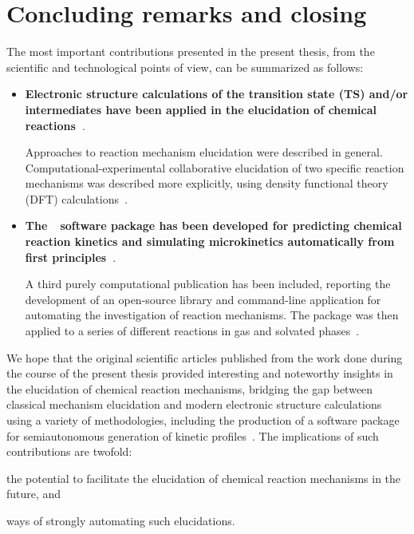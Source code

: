 \chapter{Concluding remarks and closing}%
\label{ch:conclusion}


The most important contributions presented in the present thesis,
from the scientific and technological points of view, can be summarized as follows:

\begin{itemize}
	\item \textbf{Electronic structure calculations of the transition state (TS)
		      and/or intermediates have been applied
		      in the elucidation of chemical reactions~\cite{Coelho_2019,Oliveira_2020}}.

	      Approaches to reaction mechanism elucidation were described in general.
	      Computational-experimental collaborative elucidation of two specific reaction mechanisms was described more explicitly,
	      using density functional theory (DFT) calculations~\cite{Coelho_2019,Oliveira_2020}.

	\item \textbf{The~\overreact{}~software package has been developed for predicting chemical reaction kinetics
		      and simulating microkinetics automatically from first principles~\cite{Schneider_2022}}.

	      A third purely computational publication has been included,
	      reporting the development of an open-source library
	      and command-line application for automating the investigation
	      of reaction mechanisms.
	      The package was then applied to a series of different reactions
	      in gas and solvated phases~\cite{Schneider_2022}.
\end{itemize}


We hope that the original scientific articles published from the work done
during the course of the present thesis provided
interesting and noteworthy insights in the elucidation of chemical reaction mechanisms,
bridging the gap between classical mechanism elucidation
and modern electronic structure calculations using a variety of methodologies,
including the production of a software package for semiautonomous generation
of kinetic profiles~\cite{Schneider_2022}.
The implications of such contributions are twofold:
%
\begin{itemize*}
	\item the potential to facilitate the elucidation of chemical reaction mechanisms in the future, and
	\item ways of strongly automating such elucidations.
\end{itemize*}

